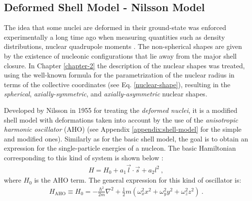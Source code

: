 
\subsection{Deformed Shell Model - Nilsson Model}
\label{nilsson-model-section}

The idea that some nuclei are deformed in their ground-state was enforced experimentally a long time ago when measuring quantities such as density distributions, nuclear quadrupole moments \cite{casten2000nuclear}. The non-spherical shapes are given by the existence of nucleonic configurations that lie away from the major shell closure. In Chapter \ref{chapter-2} the description of the nuclear shapes was treated, using the well-known formula for the parametrization of the nuclear radius in terms of the collective coordinates (see Eq. \ref{nuclear-shape}), resulting in the \emph{spherical}, \emph{axially-symmetric}, and \emph{axially-asymmetric} nuclear shapes.

Developed by Nilsson in 1955 \cite{nilsson1955binding} for treating the \emph{deformed nuclei}, it is a modified shell model with deformations taken into account by the use of the \emph{anisotropic harmonic oscillator} (AHO) (see Appendix \ref{appendix:shell-model} for the simple and modified ones). Similarly as for the basic shell model, the goal is to obtain an expression for the single-particle energies of a nucleon. The basic Hamiltonian corresponding to this kind of system is shown below \cite{bertulani2007nuclear}:
\begin{align}
    H=H_0+a_1\vec{l}\cdot\vec{s}+a_2l^2\ ,
    \label{nilsson-simple-hamiltonian}
\end{align}
where $H_0$ is the AHO term. The general expression for this kind of oscillator is:
\begin{align}
    H_\text{AHO}\equiv H_0=-\frac{\hbar^2}{2m}\nabla^2+\frac{1}{2}m(\omega_x^2x^2+\omega_y^2y^2+\omega_z^2z^2)\ .
\end{align}

